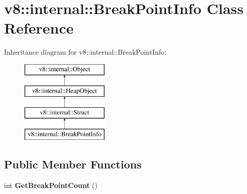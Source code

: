 \hypertarget{classv8_1_1internal_1_1_break_point_info}{}\section{v8\+:\+:internal\+:\+:Break\+Point\+Info Class Reference}
\label{classv8_1_1internal_1_1_break_point_info}
Inheritance diagram for v8\+:\+:internal\+:\+:Break\+Point\+Info\+:\begin{figure}[H]
\begin{center}
\leavevmode
\includegraphics[height=4.000000cm]{classv8_1_1internal_1_1_break_point_info}
\end{center}
\end{figure}
\subsection*{Public Member Functions}
\begin{DoxyCompactItemize}
\item 
\hypertarget{classv8_1_1internal_1_1_break_point_info_afef5eea1b97cdc1c1a52ecbabc22e900}{}int {\bfseries Get\+Break\+Point\+Count} ()\label{classv8_1_1internal_1_1_break_point_info_afef5eea1b97cdc1c1a52ecbabc22e900}

\end{DoxyCompactItemize}
